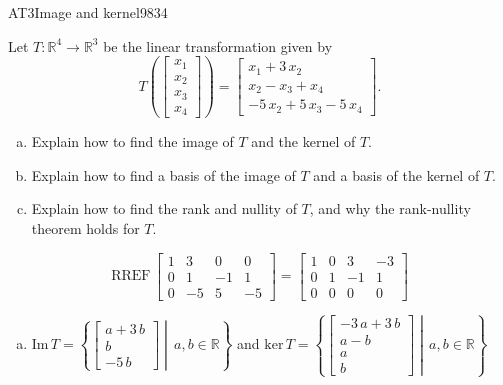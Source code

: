 \begin{exercise}{AT3}{Image and kernel}{9834} 
\begin{exerciseStatement} 

 Let \(T:\mathbb{R}^4 \to \mathbb{R}^3\) be the linear transformation given by \[T\left( \left[\begin{array}{c}
x_{1} \\
x_{2} \\
x_{3} \\
x_{4}
\end{array}\right] \right) = \left[\begin{array}{c}
x_{1} + 3 \, x_{2} \\
x_{2} - x_{3} + x_{4} \\
-5 \, x_{2} + 5 \, x_{3} - 5 \, x_{4}
\end{array}\right].\] 

 

\begin{enumerate}[(a)]
\item Explain how to find the image of \(T\) and the kernel of \(T\).
\item Explain how to find a basis of the image of \(T\) and a basis of the kernel of \(T\).
\item Explain how to find the rank and nullity of \(T\), and why the rank-nullity theorem holds for \(T\).
\end{enumerate}

     \end{exerciseStatement}
 \begin{exerciseAnswer} 

\[\mathrm{RREF}\,\left[\begin{array}{cccc}
1 & 3 & 0 & 0 \\
0 & 1 & -1 & 1 \\
0 & -5 & 5 & -5
\end{array}\right]=\left[\begin{array}{cccc}
1 & 0 & 3 & -3 \\
0 & 1 & -1 & 1 \\
0 & 0 & 0 & 0
\end{array}\right]\]

 

\begin{enumerate}[(a)]
\item  

 \(\mathrm{Im}\,T =  \left\{ \left[\begin{array}{c}
a + 3 \, b \\
b \\
-5 \, b
\end{array}\right] \middle|\,a,b\in\mathbb{R}\right\}\) and \(\mathrm{ker}\,T = \left\{ \left[\begin{array}{c}
-3 \, a + 3 \, b \\
a - b \\
a \\
b
\end{array}\right] \middle|\,a,b\in\mathbb{R}\right\}\) 


\end{enumerate}
\end{exerciseAnswer}
\end{exercise}
